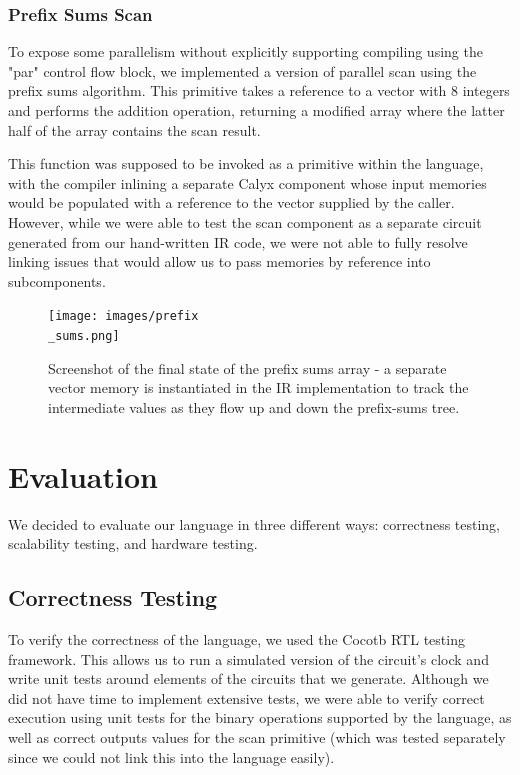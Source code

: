 \documentclass[12pt]{article}
\begin{document}
\subsubsection{Prefix Sums Scan}
To expose some parallelism without explicitly supporting compiling using the "par" control flow block,
we implemented a version of parallel scan using the prefix sums algorithm. This primitive takes
a reference to a vector with 8 integers and performs the addition operation, returning a modified
array where the latter half of the array contains the scan result.

This function was supposed to be invoked as a primitive within the language, with the compiler inlining
a separate Calyx component whose input memories would be populated with a reference to the vector supplied
by the caller. However, while we were able to test the scan component as a separate circuit generated from our
hand-written IR code, we were not able to fully resolve linking issues that would allow us to pass memories by
reference into subcomponents.

\begin{figure}[H]
    \texttt{[image: images/prefix\\\_sums.png]}
    \caption{Screenshot of the final state of the prefix sums array - a separate vector memory
    is instantiated in the IR implementation to track the intermediate values as they flow
    up and down the prefix-sums tree.}
\end{figure}

\section{Evaluation}
We decided to evaluate our language in three different ways: correctness testing, scalability testing, and hardware testing.
\subsection{Correctness Testing}
To verify the correctness of the language, we used the Cocotb RTL testing framework. This allows
us to run a simulated version of the circuit's clock and write unit tests around elements of the circuits
that we generate. Although we did not have time to implement extensive tests, we were able to verify
correct execution using unit tests for the binary operations supported by the language,
as well as correct outputs values for the scan primitive (which was tested separately since we could not link
this into the language easily).
\end{document}
